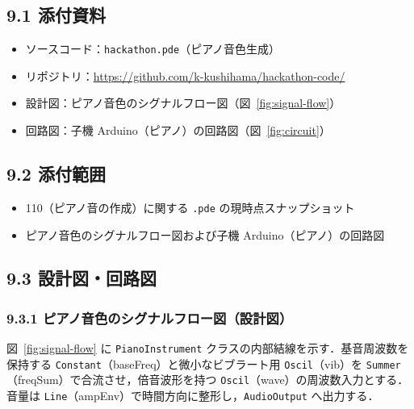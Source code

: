 \documentclass[a4paper,11pt]{ltjsarticle}
\providecommand{\％}{\%}
\begin{document}
\subsection*{9.1 添付資料}

\begin{itemize}
    \item ソースコード：\texttt{hackathon.pde}（ピアノ音色生成）
    \item リポジトリ：\url{https://github.com/k-kushihama/hackathon-code/}
    \item 設計図：ピアノ音色のシグナルフロー図（図~\ref{fig:signal-flow}）
    \item 回路図：子機 Arduino（ピアノ）の回路図（図~\ref{fig:circuit}）
\end{itemize}

\subsection*{9.2 添付範囲}

\begin{itemize}
    \item 110（ピアノ音の作成）に関する \texttt{.pde} の現時点スナップショット
    \item ピアノ音色のシグナルフロー図および子機 Arduino（ピアノ）の回路図
\end{itemize}

\subsection*{9.3 設計図・回路図}

\subsubsection*{9.3.1 ピアノ音色のシグナルフロー図（設計図）}

図~\ref{fig:signal-flow} に \texttt{PianoInstrument} クラスの内部結線を示す．基音周波数を保持する \texttt{Constant}（baseFreq）と微小なビブラート用 \texttt{Oscil}（vib）を \texttt{Summer}（freqSum）で合流させ，倍音波形を持つ \texttt{Oscil}（wave）の周波数入力とする．音量は \texttt{Line}（ampEnv）で時間方向に整形し，\texttt{AudioOutput} へ出力する．
\end{document}
